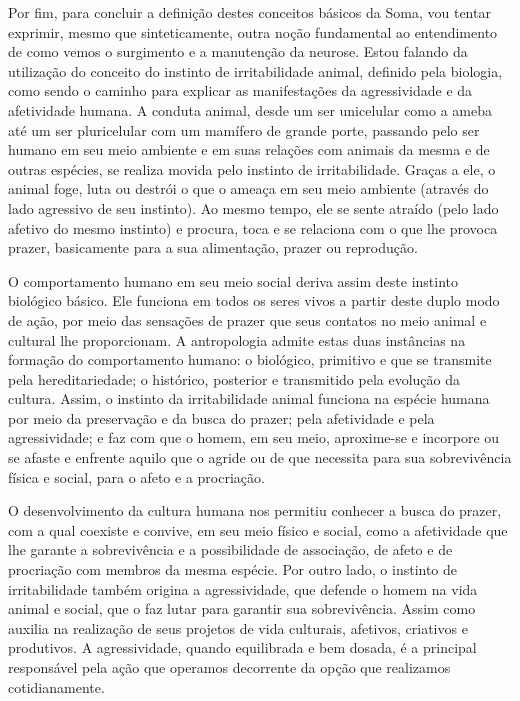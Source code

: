 Por fim, para concluir a definição destes conceitos básicos da Soma, vou
tentar exprimir, mesmo que sinteticamente, outra noção fundamental ao
entendimento de como vemos o surgimento e a manutenção da neurose. Estou
falando da utilização do conceito do instinto de irritabilidade animal,
definido pela biologia, como sendo o caminho para explicar as
manifestações da agressividade e da afetividade humana. A conduta
animal, desde um ser unicelular como a ameba até um ser pluricelular com
um mamífero de grande porte, passando pelo ser humano em seu meio
ambiente e em suas relações com animais da mesma e de outras espécies,
se realiza movida pelo instinto de irritabilidade. Graças a ele, o
animal foge, luta ou destrói o que o ameaça em seu meio ambiente
(através do lado agressivo de seu instinto). Ao mesmo tempo, ele se
sente atraído (pelo lado afetivo do mesmo instinto) e procura, toca e se
relaciona com o que lhe provoca prazer, basicamente para a sua
alimentação, prazer ou reprodução.

O comportamento humano em seu meio social deriva assim deste instinto
biológico básico. Ele funciona em todos os seres vivos a partir deste
duplo modo de ação, por meio das sensações de prazer que seus contatos
no meio animal e cultural lhe proporcionam. A antropologia admite estas
duas instâncias na formação do comportamento humano: o biológico,
primitivo e que se transmite pela hereditariedade; o histórico,
posterior e transmitido pela evolução da cultura. Assim, o instinto da
irritabilidade animal funciona na espécie humana por meio da preservação
e da busca do prazer; pela afetividade e pela agressividade; e faz com
que o homem, em seu meio, aproxime-se e incorpore ou se afaste e
enfrente aquilo que o agride ou de que necessita para sua sobrevivência
física e social, para o afeto e a procriação.

O desenvolvimento da cultura humana nos permitiu conhecer a busca do
prazer, com a qual coexiste e convive, em seu meio físico e social, como
a afetividade que lhe garante a sobrevivência e a possibilidade de
associação, de afeto e de procriação com membros da mesma espécie. Por
outro lado, o instinto de irritabilidade também origina a agressividade,
que defende o homem na vida animal e social, que o faz lutar para
garantir sua sobrevivência. Assim como auxilia na realização de seus
projetos de vida culturais, afetivos, criativos e produtivos. A
agressividade, quando equilibrada e bem dosada, é a principal
responsável pela ação que operamos decorrente da opção que realizamos
cotidianamente.

